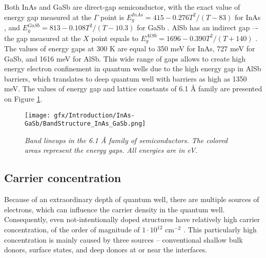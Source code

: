 \documentclass[titlepage,a4paper]{book}
\newcommand{\wciecie}{\quad\phantom{v}}
\begin{document}
Both InAs and GaSb are direct-gap semiconductor, with the exact value of energy gap measured at the $\Gamma$ point is $E_g^{InAs} = 415-0.276 T^2/(T-83)$ for InAs \cite{Fang_InAs}, and $E_g^{GaSb} = 813 - 0.108 T^2/(T-10.3)$ for GaSb \cite{Wu_GaSb}. AlSb has an indirect gap –- the gap measured at the $X$ point equals to $E_g^{AlSb} = 1696 - 0.390 T^2/(T+140)$ \cite{Vurgaftman_AlSb}. The values of energy gaps at 300 K are equal to 350 meV for InAs, 727 meV for GaSb, and 1616 meV for AlSb. This wide range of gaps allows to create high energy electron confinement in quantum wells due to the high energy gap in AlSb barriers, which translates to deep quantum well with barriers as high as 1350 meV. The values of energy gap and lattice constants of 6.1 Å family are presented on Figure \ref{fig:BandStructure_InAs_GaSb}.

\begin{figure}[ht]
	\centering
	\texttt{[image: gfx/Introduction/InAs-GaSb/BandStructure\_InAs\_GaSb.png]}
	\vspace{-10pt}
	\caption{\textit{Band lineups in the 6.1 Å family of semiconductors. The colored areas represent the energy gaps. All energies are in eV.}}
	\label{fig:BandStructure_InAs_GaSb}
\end{figure} 

\subsection{Carrier concentration}
\wciecie
Because of an extraordinary depth of quantum well, there are multiple sources of electrons, which can influence the carrier density in the quantum well. Consequently, even not-intentionally doped structures have relatively high carrier concentration, of the order of magnitude of $1 \cdot 10^{12}$ cm$^{-2}$ \cite{Tuttle_InAs_concentration}. This particularly high concentration is mainly caused by three sources -- conventional shallow bulk donors, surface states, and deep donors at or near the interfaces. 
\end{document}
